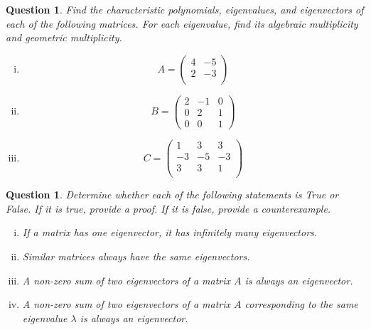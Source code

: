 \documentclass[12pt]{article}
\newtheorem{question}[thm]{Question}
\begin{document}
\begin{question}
\normalfont
Find the characteristic polynomials, eigenvalues, and eigenvectors of each of the following matrices. For each eigenvalue, find its algebraic multiplicity and geometric multiplicity.
\begin{enumerate}[(i)]
\item
\[
A= \begin{pmatrix}
			4 & -5\\
			2 & -3\\
		\end{pmatrix}
\]

\item
\[
B= \begin{pmatrix}
			2 & -1 & 0\\
			0 & 2 & 1\\
			0 & 0 & 1
		\end{pmatrix}
\]
\item
\[
C= \begin{pmatrix}
			1 & 3 & 3\\
			-3 & -5 & -3\\
			3 & 3 & 1 \\
		\end{pmatrix}
\]
\end{enumerate}

\end{question}
\vspace{1cm}



\vspace{1cm}

\begin{question}
\normalfont
Determine whether each of the following statements is True or False. If it is true, provide a proof. If it is false, provide a counterexample. 
\begin{enumerate}[(i)]

\item If a matrix has one eigenvector, it has infinitely many eigenvectors.

\item Similar matrices always have the same eigenvectors.

\item A non-zero sum of two eigenvectors of a matrix $A$ is always an eigenvector.

\item A non-zero sum of two eigenvectors of a matrix $A$ corresponding to the same eigenvalue $\lambda$ is always an eigenvector. 

\end{enumerate}

\end{question}
\vspace{1cm}
\end{document}
